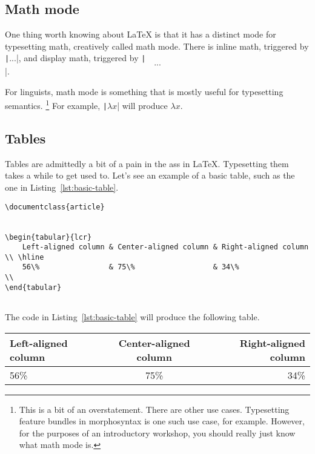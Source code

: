 \subsection{Math mode}
\label{subsec:math-mode}

One thing worth knowing about \LaTeX{} is that it has a distinct mode for typesetting math, creatively called math mode.
There is inline math, triggered by \texttt|$...$|, and display math, triggered by \texttt|\[...\]|.

For linguists, math mode is something that is mostly useful for typesetting semantics.%
\footnote{%
This is a bit of an overstatement.
There are other use cases.
Typesetting feature bundles in morphosyntax is one such use case, for example.
However, for the purposes of an introductory workshop, you should really just know what math mode is.%
}
For example, \texttt|$\lambda x$| will produce $\lambda x$.

\subsection{Tables}
\label{subsec:tables}

Tables are admittedly a bit of a pain in the ass in \LaTeX.
Typesetting them takes a while to get used to.
Let's see an example of a basic table, such as the one in Listing~\ref{lst:basic-table}.

\begin{listing}[htbp]
	\centering
	\begin{verbatim}
\documentclass{article}


\begin{tabular}{lcr}
    Left-aligned column & Center-aligned column & Right-aligned column \\ \hline
    56\%                & 75\%                  & 34\%                 \\
\end{tabular}


	\end{verbatim}
	\caption{A basic table in \LaTeX}
	\label{lst:basic-table}
\end{listing}

\begin{minipage}{\textwidth}

The code in Listing~\ref{lst:basic-table} will produce the following table.

\begin{center}
	\begin{tabular}{lcr}
		Left-aligned column & Center-aligned column & Right-aligned column \\ \hline
		56\%                & 75\%                  & 34\%                 \\
	\end{tabular}
\end{center}

\end{minipage}

